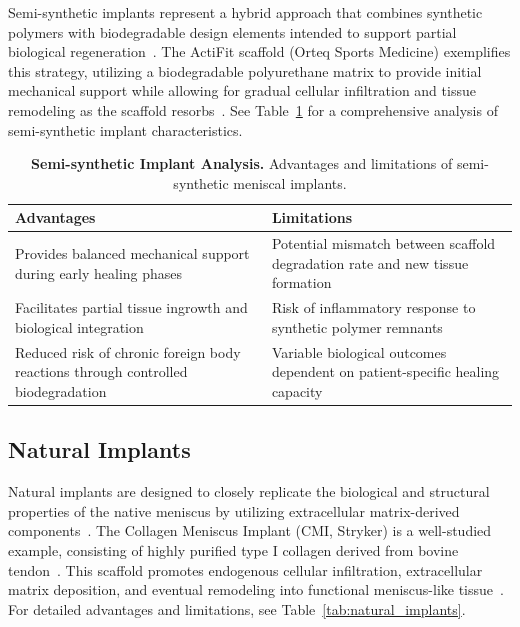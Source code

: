 Semi-synthetic implants represent a hybrid approach that combines synthetic polymers with biodegradable design elements intended to support partial biological regeneration~\cite{li2024advancedhydrogel, sun2017overviewscaffold}. The ActiFit scaffold (Orteq Sports Medicine) exemplifies this strategy, utilizing a biodegradable polyurethane matrix to provide initial mechanical support while allowing for gradual cellular infiltration and tissue remodeling as the scaffold resorbs~\cite{gupta2020meniscaltissue, baek2015meniscustissue}. See Table~\ref{tab:semi_synthetic_implants} for a comprehensive analysis of semi-synthetic implant characteristics.

\begin{table}[H]
\centering
\setlength{\tabcolsep}{8pt}
\begin{tabular}{|p{5.5cm}|p{5.5cm}|}
\hline
\rowcolor{gray!20}
\textbf{Advantages} & \textbf{Limitations} \\ \hline
Provides balanced mechanical support during early healing phases & 
Potential mismatch between scaffold degradation rate and new tissue formation \\ \hline
Facilitates partial tissue ingrowth and biological integration & 
Risk of inflammatory response to synthetic polymer remnants \\ \hline
Reduced risk of chronic foreign body reactions through controlled biodegradation & 
Variable biological outcomes dependent on patient-specific healing capacity \\ \hline
\end{tabular}
\caption[Semi-synthetic Implant Analysis]{\textbf{Semi-synthetic Implant Analysis.} Advantages and limitations of semi-synthetic meniscal implants.}
\label{tab:semi_synthetic_implants}\end{table}

\newpage
\subsection{Natural Implants}

Natural implants are designed to closely replicate the biological and structural properties of the native meniscus by utilizing extracellular matrix-derived components~\cite{ma2025structurallysophisticated, li2024advancedhydrogel}. The Collagen Meniscus Implant (CMI, Stryker) is a well-studied example, consisting of highly purified type I collagen derived from bovine tendon~\cite{gupta2020meniscaltissue, sun2017overviewscaffold}. This scaffold promotes endogenous cellular infiltration, extracellular matrix deposition, and eventual remodeling into functional meniscus-like tissue~\cite{baek2015meniscustissue, kwon2019surgicaltissue}. For detailed advantages and limitations, see Table~\ref{tab:natural_implants}.

